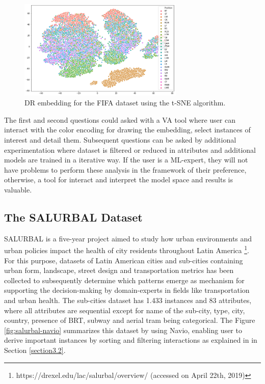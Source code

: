 \begin{figure}[ht]
 \centering
 \includegraphics[width=0.7\textwidth]{fifa-tsne.png}
 \caption{DR embedding for the FIFA dataset using the t-SNE algorithm.}
 \label{fig:fifa-tsne}
\end{figure}

The first and second questions could asked with a VA tool where user can interact with the color encoding for drawing the embedding, select instances of interest and detail them. Subsequent questions can be asked by additional experimentation where dataset is filtered or reduced in attributes and additional models are trained in a iterative way. If the user is a ML-expert, they will not have problems to perform these analysis in the framework of their preference, otherwise, a tool for interact and interpret the model space and results is valuable.

\subsection{The SALURBAL Dataset}
\label{subsection1.1.2}

SALURBAL is a five-year project aimed to study how urban environments and urban policies impact the health of city residents throughout Latin America \footnote{https://drexel.edu/lac/salurbal/overview/ (accessed on April 22th, 2019)}. For this purpose, datasets of Latin American cities and sub-cities containing urban form, landscape, street design and transportation metrics has been collected to subsequently determine which patterns emerge as mechanism for supporting the decision-making by domain-experts in fields like transportation and urban health. The sub-cities dataset has 1.433 instances and 83 attributes, where all attributes are sequential except for name of the sub-city, type, city, country, presence of BRT, subway and aerial tram being categorical. The Figure \ref{fig:salurbal-navio} summarizes this dataset by using Navio, enabling user to derive important instances by sorting and filtering interactions as explained in  in Section \ref{section3.2}.

